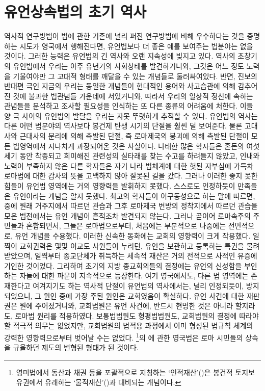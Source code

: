 \chapter{유언상속법의 초기 역사}

역사적 연구방법이
법에 관한
기존에 널리 퍼진 연구방법에 비해 우수하다는 것을
증명하는 시도가
영국에서
행해진다면,
유언법보다 더 좋은 예를 보여주는 법분야는 없을 것이다.
그러한 능력은 유언법의 긴 역사와 오랜 지속성에 빚지고 있다.
역사의 초창기의 유언법에서
우리는
아주 유년기의 사회상태를 발견하거니와,
그것은 어느 정도 노력을 기울여야만
그 고대적 형태를 깨달을 수 있는 개념들로 둘러싸여있다.
반면, 진보의 반대편 극인 지금의 우리는
동일한 개념들이
현대적인 용어와 사고습관에 의해 감추어진 것에
불과한
법관념들 가운데에 서있거니와,
따라서
우리의 일상적 정신에 속하는 관념들을 분석하고 조사할 필요성을
인식하는 또 다른 종류의 어려움에 처한다.
이들 양 극 사이의 유언법의 발달을
우리는
자못 뚜렷하게 추적할 수 있다.
유언법의 역사는
다른 어떤 법분야의 역사보다
봉건제 탄생 시기의 단절을 훨씬 덜 보여준다.
물론
고대사와 근대사의 분리에 의해 촉발된 단절,
즉 로마제국의 붕괴에 의해 촉발된 단절이
모든 법영역에서
지나치게 과장되어온 것은 사실이다.
나태한
많은 학자들은
혼돈의 여섯 세기 동안 착종되고 희미해진 관련성의 실타래를
찾는 수고를 하려들지 않았고,
인내와 노력이 부족하지 않은 다른 학자들은
자기 나라 법체계에 대한 헛된 자부심에 가득차
로마법에 대한 감사의 뜻을 고백하지 않아 잘못된 길을 갔다.
그러나 이러한 좋지 못한 힘들이 유언법 영역에는 거의 영향력을 발휘하지 못했다.
스스로도 인정하듯이 만족들은 유언이라는 개념을 알지 못했다.
최고의 학자들이 이구동성으로 하는 말에 따르면,
 중에
원래 거주지에서 따르던 관습과 그후
로마제국 변방의 정착지에서 따르던 관습을 모은 법전에서는
유언 개념이 흔적조차 발견되지 않는다.
그러나 곧이어 로마속주의 주민들과 혼합되면서, 그들은
로마법으로부터, 처음에는 부분적으로 나중에는 전면적으로,
유언 개념을 수용했다.
이러한 신속한 동화에는 교회의 영향력이 크게 작용했다.
일찍이 교회권력은 몇몇 이교도 사원들이 누리던,
유언을 보관하고 등록하는 특권을 물려받았으며,
일찍부터 종교단체가 취득하는 세속적 재산은
거의 전적으로 사적인 유증에 기인한 것이었다.
그리하여 초기의 지방 종교회의들의 결정에는
유언의 신성함을 부인하는 자들에 대한 파문이 지속적으로 등장한다.
여기 영국에서도,
다른 법 영역에는 존재한다고 여겨지기도 하는
역사적 단절이
유언법의 역사에서는, 널리 인정되듯이, 방지되었으니, 그 원인 중에
가장 주된 원인은 교회였음이 확실하다.
유언 사건에 대한 재판권은 원에 주어졌거니와,
교회법원은 유언 사건에, 반드시 현명한 것은 아니라 할지라도, 로마법 원리를 적용하였다.
보통법법원도 형평법법원도,
교회법원의 결정에 따라야 할 적극적 의무는 없었지만,
교회법원의 법적용 과정에서 이미 형성된 법규칙 체계의 강력한 영향력으로부터
벗어날 수는 없었다.
\footnote{%
  영미법에서 동산과 채권 등을 포괄적으로 지칭하는
  `인적재산'()은
  봉건적 토지보유권에서 유래하는 `물적재산'()과
  대비되는 개념이다.
}의 에 관한 영국법은
로마 시민들의 상속을 규율하던 제도의 변형된 형태가 된 것이다.


